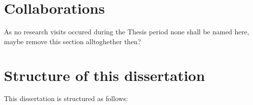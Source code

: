
    


\section{Collaborations}\label{sec:intro-collabs}
As no research visits occured during the Thesis period none shall be named here, maybe remove this section alltoghether then?


\section{Structure of this dissertation}\label{sec:intro-structure}
This dissertation is structured as follows:

